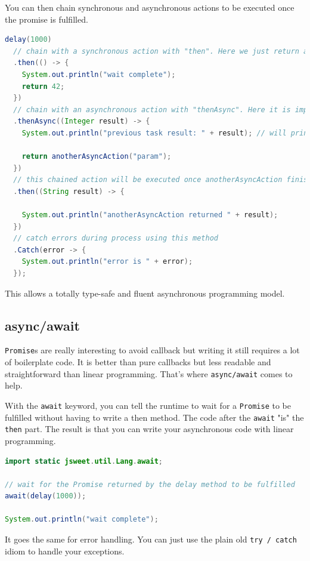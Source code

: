 \documentclass[a4paper]{report}
\begin{document}
You can then chain synchronous and asynchronous actions to be executed once the promise is fulfilled.

\begin{lstlisting}[language=Java]
delay(1000)
  // chain with a synchronous action with "then". Here we just return a constant.
  .then(() -> {
    System.out.println("wait complete");
    return 42;
  })
  // chain with an asynchronous action with "thenAsync". Here it is implied that anotherAsyncAction(String) returns a Promise<...>
  .thenAsync((Integer result) -> {
    System.out.println("previous task result: " + result); // will print "previous task result: 42"
    
    return anotherAsyncAction("param");
  })
  // this chained action will be executed once anotherAsyncAction finishes its execution.
  .then((String result) -> {

    System.out.println("anotherAsyncAction returned " + result);
  }) 
  // catch errors during process using this method
  .Catch(error -> {
    System.out.println("error is " + error);
  });
\end{lstlisting}

This allows a totally type-safe and fluent asynchronous programming model.

\subsection{async/await}

\texttt{Promise}s are really interesting to avoid callback but writing it still requires a lot of boilerplate code. It is better than pure callbacks but less readable and straightforward than linear programming. That's where \texttt{async/await} comes to help.

With the \texttt{await} keyword, you can tell the runtime to wait for a \texttt{Promise} to be fulfilled without having to write a then method. The code after the \texttt{await} "is" the \texttt{then} part. The result is that you can write your asynchronous code with linear programming.

\begin{lstlisting}[language=Java]
import static jsweet.util.Lang.await;

// wait for the Promise returned by the delay method to be fulfilled
await(delay(1000));

System.out.println("wait complete");
\end{lstlisting}

It goes the same for error handling. You can just use the plain old \texttt{try / catch} idiom to handle your exceptions.
\end{document}
